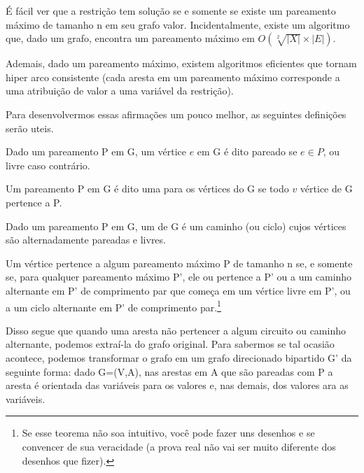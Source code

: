 \documentclass{article}
\begin{document}
É fácil ver que a restrição  tem solução se e
somente se existe um pareamento máximo de tamanho n em seu grafo
valor. Incidentalmente, existe um algoritmo que, dado um grafo,
encontra um pareamento máximo em $O(\sqrt[2]{|X|}\times|E|)$.

Ademais, dado um pareamento máximo, existem algoritmos eficientes que
tornam  hiper arco consistente (cada aresta em
um pareamento máximo corresponde a uma atribuição de valor a uma
variável da restrição).

Para desenvolvermos essas afirmações um pouco melhor, as seguintes
definições serão uteis.

\begin{definition}
  Dado um pareamento P em G, um vértice $e$ em G é dito pareado se
  $e\in P$, ou livre caso contrário.
\end{definition}

\begin{definition}
  Um pareamento P em G é dito uma  para os
  vértices do G se todo $v$ vértice de G pertence a P.
\end{definition}

\begin{definition}
  Dado um pareamento P em G, um  de G é um caminho (ou ciclo) cujos vértices são
  alternadamente pareadas e livres.
\end{definition}

\begin{theorem}
  Um vértice pertence a algum pareamento máximo P de tamanho n se, e
  somente se, para qualquer pareamento máximo P', ele ou pertence a P'
  ou a um caminho alternante em P' de comprimento par que começa em um
  vértice livre em P', ou a um ciclo alternante em P' de comprimento
  par.\footnote{Se esse teorema não soa intuitivo, você pode fazer uns
    desenhos e se convencer de sua veracidade (a prova real não vai
    ser muito diferente dos desenhos que fizer).}
\end{theorem}

Disso segue que quando uma aresta não pertencer a algum circuito ou
caminho alternante, podemos extraí-la do grafo original.  Para
sabermos se tal ocasião acontece, podemos transformar o grafo em um
grafo direcionado bipartido G' da seguinte forma: dado G=(V,A), nas
arestas em A que são pareadas com P a aresta é orientada das variáveis
para os valores e, nas demais, dos valores ara as variáveis.
\end{document}
